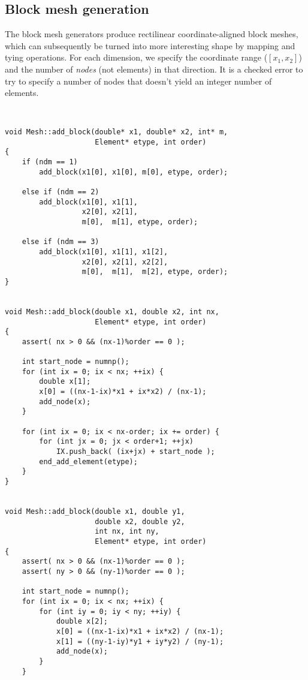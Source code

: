 \subsection{Block mesh generation}

The block mesh generators produce rectilinear coordinate-aligned
block meshes, which can subsequently be turned into more
interesting shape by mapping and tying operations.  For each
dimension, we specify the coordinate range ($[x_1, x_2]$) and the
number of {\em nodes} (not elements) in that direction.  It is a
checked error to try to specify a number of nodes that doesn't
yield an integer number of elements.

\begin{verbatim}


void Mesh::add_block(double* x1, double* x2, int* m,
                     Element* etype, int order)
{
    if (ndm == 1)
        add_block(x1[0], x1[0], m[0], etype, order);

    else if (ndm == 2)
        add_block(x1[0], x1[1],
                  x2[0], x2[1],
                  m[0],  m[1], etype, order);

    else if (ndm == 3)
        add_block(x1[0], x1[1], x1[2],
                  x2[0], x2[1], x2[2],
                  m[0],  m[1],  m[2], etype, order);
}


void Mesh::add_block(double x1, double x2, int nx,
                     Element* etype, int order)
{
    assert( nx > 0 && (nx-1)%order == 0 );

    int start_node = numnp();
    for (int ix = 0; ix < nx; ++ix) {
        double x[1];
        x[0] = ((nx-1-ix)*x1 + ix*x2) / (nx-1);
        add_node(x);
    }

    for (int ix = 0; ix < nx-order; ix += order) {
        for (int jx = 0; jx < order+1; ++jx)
            IX.push_back( (ix+jx) + start_node );
        end_add_element(etype);
    }
}


void Mesh::add_block(double x1, double y1,
                     double x2, double y2,
                     int nx, int ny,
                     Element* etype, int order)
{
    assert( nx > 0 && (nx-1)%order == 0 );
    assert( ny > 0 && (ny-1)%order == 0 );

    int start_node = numnp();
    for (int ix = 0; ix < nx; ++ix) {
        for (int iy = 0; iy < ny; ++iy) {
            double x[2];
            x[0] = ((nx-1-ix)*x1 + ix*x2) / (nx-1);
            x[1] = ((ny-1-iy)*y1 + iy*y2) / (ny-1);
            add_node(x);
        }
    }


\end{verbatim}
